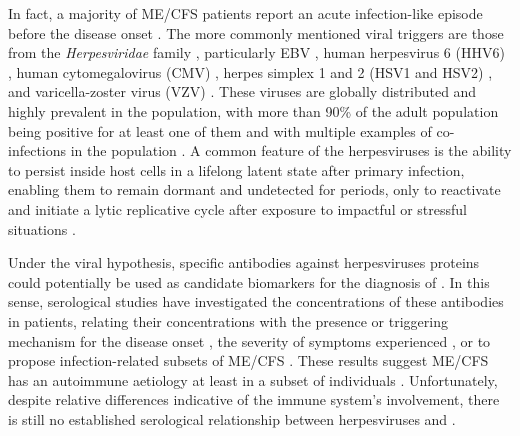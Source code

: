 In fact, a majority of ME/CFS patients report an acute infection-like episode before the disease onset \citep{chu2019OnsetPatterns}.
The more commonly mentioned viral triggers are those from the \textit{Herpesviridae} family \citep{blombergAntibodiesHumanHerpesviruses2019, ariza2021MyalgicEncephalomyelitis}, particularly EBV \citep{ruiz-pablos2021EpsteinBarrVirus}, human herpesvirus 6 (HHV6) \citep{lee2021SalivaryDNA, kasimir2022TissueSpecific}, human cytomegalovirus (CMV) \citep{lerner2002IgMSerum, domingues2021HerpesvirusesSerologya}, herpes simplex 1 and 2 (HSV1 and HSV2) \citep{domingues2023AssociationAnalysis}, and varicella-zoster virus (VZV) \citep{halpin2017MyalgicEncephalomyelitis}.
These viruses are globally distributed and highly prevalent in the population, with more than 90\% of the adult population being positive for at least one of them and with multiple examples of co-infections in the population \citep{rasa2018ChronicViral}.
A common feature of the herpesviruses is the ability to persist inside host cells in a lifelong latent state after primary infection, enabling them to remain dormant and undetected for periods, only to reactivate and initiate a lytic replicative cycle after exposure to impactful or stressful situations \citep{lan2017HerpesvirusesEpidemiology, rooney2019HerpesVirus}.


Under the viral hypothesis, specific antibodies against herpesviruses proteins could potentially be used as candidate biomarkers for the diagnosis of \cfs.
In this sense, serological studies have investigated the concentrations of these antibodies in patients, relating their concentrations with the presence or triggering mechanism for the disease onset \citep{loebel2017SerologicalProfiling, blombergAntibodiesHumanHerpesviruses2019}, the severity of symptoms experienced \citep{domingues2023AssociationAnalysis}, or to propose infection-related subsets of ME/CFS \citep{eriksen2018MECFS}.
These results suggest ME/CFS has an autoimmune aetiology at least in a subset of individuals \citep{sotznyMyalgicEncephalomyelitisChronic2018}.
Unfortunately, despite relative differences indicative of the immune system's involvement, there is still no established serological relationship between herpesviruses and \cfs \citep{ariza2020CommentaryAntibodies}.


